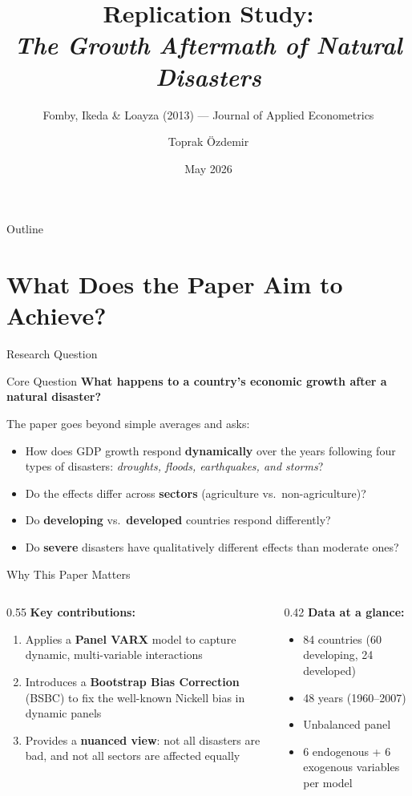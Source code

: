 \documentclass[10pt, aspectratio=169]{beamer}
\title[Replication: Natural Disasters \& Growth]{Replication Study:\\
\textit{The Growth Aftermath of Natural Disasters}}
\subtitle{Fomby, Ikeda \& Loayza (2013) --- Journal of Applied Econometrics}
\author{Toprak Özdemir}
\institute{EC 532 - Bogazici University}
\date{May 2026}
\begin{document}
\begin{frame}
\titlepage
\end{frame}

\begin{frame}{Outline}
\tableofcontents
\end{frame}

\section{What Does the Paper Aim to Achieve?}

\begin{frame}{Research Question}
\begin{block}{Core Question}
\textbf{What happens to a country's economic growth after a natural disaster?}
\end{block}
\vspace{0.5em}
The paper goes beyond simple averages and asks:
\begin{itemize}
    \item How does GDP growth respond \textbf{dynamically} over the years following four types of disasters: \textit{droughts, floods, earthquakes, and storms}?
    \item Do the effects differ across \textbf{sectors} (agriculture vs.\ non-agriculture)?
    \item Do \textbf{developing} vs.\ \textbf{developed} countries respond differently?
    \item Do \textbf{severe} disasters have qualitatively different effects than moderate ones?
\end{itemize}
\end{frame}

\begin{frame}{Why This Paper Matters}
\begin{columns}
\begin{column}{0.55\textwidth}
\textbf{Key contributions:}
\begin{enumerate}
    \item Applies a \textbf{Panel VARX} model to capture dynamic, multi-variable interactions
    \item Introduces a \textbf{Bootstrap Bias Correction} (BSBC) to fix the well-known Nickell bias in dynamic panels
    \item Provides a \textbf{nuanced view}: not all disasters are bad, and not all sectors are affected equally
\end{enumerate}
\end{column}
\begin{column}{0.42\textwidth}
\textbf{Data at a glance:}
\begin{itemize}
    \item 84 countries (60 developing, 24 developed)
    \item 48 years (1960--2007)
    \item Unbalanced panel
    \item 6 endogenous + 6 exogenous variables per model
\end{itemize}
\end{column}
\end{columns}
\end{frame}
\end{document}
